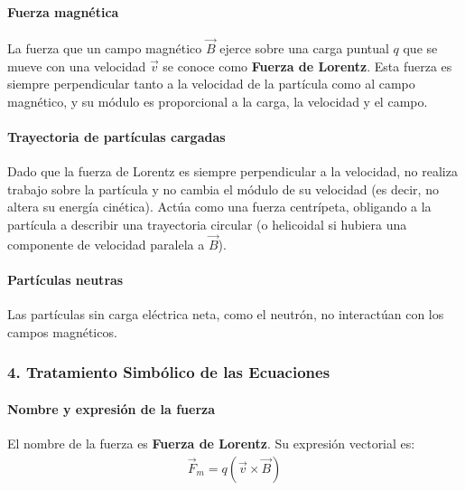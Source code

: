 \paragraph*{Fuerza magnética}
La fuerza que un campo magnético $\vec{B}$ ejerce sobre una carga puntual $q$ que se mueve con una velocidad $\vec{v}$ se conoce como \textbf{Fuerza de Lorentz}. Esta fuerza es siempre perpendicular tanto a la velocidad de la partícula como al campo magnético, y su módulo es proporcional a la carga, la velocidad y el campo.

\paragraph*{Trayectoria de partículas cargadas}
Dado que la fuerza de Lorentz es siempre perpendicular a la velocidad, no realiza trabajo sobre la partícula y no cambia el módulo de su velocidad (es decir, no altera su energía cinética). Actúa como una fuerza centrípeta, obligando a la partícula a describir una trayectoria circular (o helicoidal si hubiera una componente de velocidad paralela a $\vec{B}$).

\paragraph*{Partículas neutras}
Las partículas sin carga eléctrica neta, como el neutrón, no interactúan con los campos magnéticos.

\subsubsection*{4. Tratamiento Simbólico de las Ecuaciones}
\paragraph*{Nombre y expresión de la fuerza}
El nombre de la fuerza es \textbf{Fuerza de Lorentz}. Su expresión vectorial es:
\begin{gather}
    \vec{F}_m = q (\vec{v} \times \vec{B})
\end{gather}

